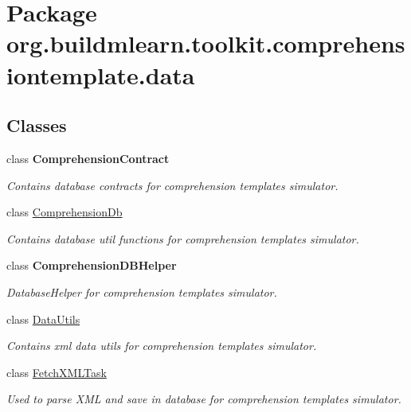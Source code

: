 \hypertarget{namespaceorg_1_1buildmlearn_1_1toolkit_1_1comprehensiontemplate_1_1data}{}\section{Package org.\+buildmlearn.\+toolkit.\+comprehensiontemplate.\+data}
\label{namespaceorg_1_1buildmlearn_1_1toolkit_1_1comprehensiontemplate_1_1data}
\subsection*{Classes}
\begin{DoxyCompactItemize}
\item 
class {\bfseries Comprehension\+Contract}
\begin{DoxyCompactList}\small\item\em Contains database contracts for comprehension template\textquotesingle{}s simulator. \end{DoxyCompactList}\item 
class \hyperlink{classorg_1_1buildmlearn_1_1toolkit_1_1comprehensiontemplate_1_1data_1_1ComprehensionDb}{Comprehension\+Db}
\begin{DoxyCompactList}\small\item\em Contains database util functions for comprehension template\textquotesingle{}s simulator. \end{DoxyCompactList}\item 
class {\bfseries Comprehension\+D\+B\+Helper}
\begin{DoxyCompactList}\small\item\em Database\+Helper for comprehension template\textquotesingle{}s simulator. \end{DoxyCompactList}\item 
class \hyperlink{classorg_1_1buildmlearn_1_1toolkit_1_1comprehensiontemplate_1_1data_1_1DataUtils}{Data\+Utils}
\begin{DoxyCompactList}\small\item\em Contains xml data utils for comprehension template\textquotesingle{}s simulator. \end{DoxyCompactList}\item 
class \hyperlink{classorg_1_1buildmlearn_1_1toolkit_1_1comprehensiontemplate_1_1data_1_1FetchXMLTask}{Fetch\+X\+M\+L\+Task}
\begin{DoxyCompactList}\small\item\em Used to parse X\+ML and save in database for comprehension template\textquotesingle{}s simulator. \end{DoxyCompactList}\end{DoxyCompactItemize}
